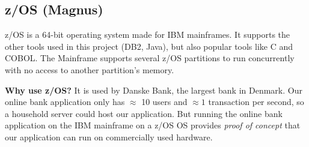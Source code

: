\subsection{z/OS (Magnus)}

z/OS is a 64-bit operating system made for IBM mainframes. It supports the other tools used in this project (DB2, Java), but also popular tools like C and COBOL. The Mainframe supports several z/OS partitions to run concurrently with no access to another partition's memory.

\textbf{Why use z/OS?} It is used by Danske Bank, the largest bank in Denmark\cite{danske_pengeinstitutter}. Our online bank application only has $\approx$ 10 users and $\approx 1$ transaction per second, so a household server could host our application. But running the online bank application on the IBM mainframe on a z/OS OS provides \textit{proof of concept} that our application can run on commercially used hardware.
